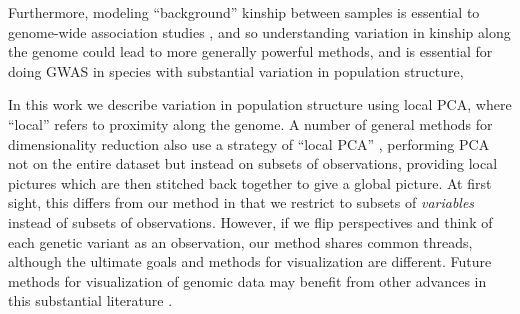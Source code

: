 \documentclass[11pt, oneside]{article}   	%
\begin{document}
Furthermore,
modeling ``background'' kinship between samples
is essential to genome-wide association studies \citep[GWAS,][]{price2006principal,astle2009population},
and so understanding variation in kinship along the genome 
could lead to more generally powerful methods,
and is essential for doing GWAS in species with substantial variation in population structure,



In this work we describe variation in population structure using local PCA,
where ``local'' refers to proximity along the genome.
A number of general methods for dimensionality reduction also use a strategy of ``local PCA''
\citep[e.g.,][]{manjon2013diffusion,kambhatla1997dimension,weingessel2000local,roweis2000nonlinear},
performing PCA not on the entire dataset but instead on subsets of observations,
providing local pictures which are then stitched back together to give a global picture.
At first sight,
this differs from our method in that we restrict to subsets of \emph{variables} instead of subsets of observations.
However, if we flip perspectives and think of each genetic variant as an observation,
our method shares common threads, although the ultimate goals and methods for visualization are different.
Future methods for visualization of genomic data
may benefit from other advances in this substantial literature 
\citep[reviewed in][]{vandermaaten2009dimensionality}.
\end{document}
